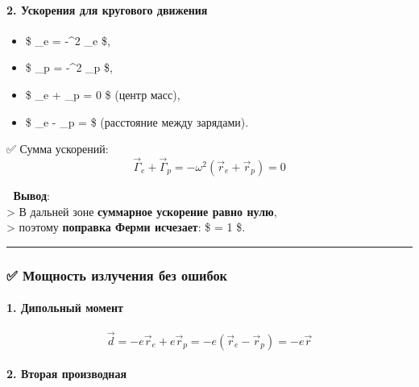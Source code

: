 \documentclass[11pt]{article}
\providecommand{\tightlist}{%
      \setlength{\itemsep}{0pt}\setlength{\parskip}{0pt}}
\begin{document}
\paragraph{2. Ускорения для кругового
движения}\label{ux443ux441ux43aux43eux440ux435ux43dux438ux44f-ux434ux43bux44f-ux43aux440ux443ux433ux43eux432ux43eux433ux43e-ux434ux432ux438ux436ux435ux43dux438ux44f}

\begin{itemize}
\tightlist
\item
  \$ \vec{\Gamma}\_e = -\omega\^{}2 \_e \$,
\item
  \$ \vec{\Gamma}\_p = -\omega\^{}2 \_p \$,
\item
  \$ \_e + \_p = 0 \$ (центр масс),
\item
  \$ \_e - \_p =  \$ (расстояние между зарядами).
\end{itemize}

✅ Сумма ускорений: \[
\vec{\Gamma}_e + \vec{\Gamma}_p = -\omega^2 (\vec{r}_e + \vec{r}_p) = 0
\]

📌 \textbf{Вывод}:\\
\textgreater{} В дальней зоне \textbf{суммарное ускорение равно нулю},\\
\textgreater{} поэтому \textbf{поправка Ферми исчезает}: \$ 
= 1 \$.

\begin{center}\rule{0.5\linewidth}{\linethickness}\end{center}

\subsubsection{✅ Мощность излучения без
ошибок}\label{ux43cux43eux449ux43dux43eux441ux442ux44c-ux438ux437ux43bux443ux447ux435ux43dux438ux44f-ux431ux435ux437-ux43eux448ux438ux431ux43eux43a}

\paragraph{1. Дипольный
момент}\label{ux434ux438ux43fux43eux43bux44cux43dux44bux439-ux43cux43eux43cux435ux43dux442}

\[
\vec{d} = -e \vec{r}_e + e \vec{r}_p = -e (\vec{r}_e - \vec{r}_p) = -e \vec{r}
\]

\paragraph{2. Вторая
производная}\label{ux432ux442ux43eux440ux430ux44f-ux43fux440ux43eux438ux437ux432ux43eux434ux43dux430ux44f}
\end{document}
